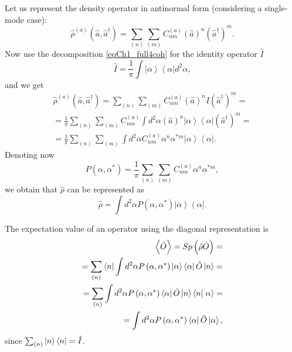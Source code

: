 Let us represent the density operator in
antinormal form (considering a single-mode case): 
\begin{equation}
\hat{\rho}^{\left(a\right)}\left(\hat{a},\hat{a}^{\dag}\right) = 
\sum_{(n)}\sum_{(m)}C^{\left(a\right)}_{nm}\left(\hat{a}\right)^n\left(\hat{a}^{\dag}\right)^m.
\end{equation}
Now use the decomposition \eqref{eqCh1_full4coh} for the identity operator $\hat{I}$
\[
\hat{I} = \frac{1}{\pi}\int \left|\alpha\right>\left<\alpha\right| d^2 \alpha,
\]
and we get
\begin{eqnarray}
\hat{\rho}^{\left(a\right)}\left(\hat{a},\hat{a}^{\dag}\right) = 
\sum_{(n)}\sum_{(m)}C^{\left(a\right)}_{nm}\left(\hat{a}\right)^n\hat{I}\left(\hat{a}^{\dag}\right)^m
= 
\nonumber \\
= \frac{1}{\pi}\sum_{(n)}\sum_{(m)}C^{\left(a\right)}_{nm}\int d^2 \alpha
\left(\hat{a}\right)^n
\left|\alpha\right>\left<\alpha\right|
\left(\hat{a}^{\dag}\right)^m = 
\nonumber \\
= \frac{1}{\pi}\sum_{(n)}\sum_{(m)}\int d^2 \alpha
C^{\left(a\right)}_{nm}
\alpha^n
\alpha^{*m}
\left|\alpha\right>\left<\alpha\right|.
\end{eqnarray}
Denoting now 
\[
P\left(\alpha, \alpha^{*}\right) = \frac{1}{\pi}\sum_{(n)}\sum_{(m)}
C^{\left(a\right)}_{nm}
\alpha^n
\alpha^{*m},
\]
we obtain that $\hat{\rho}$ can be represented as
\begin{equation}
\hat{\rho} = \int d^2 \alpha P\left(\alpha, \alpha^{*}\right) 
\left|\alpha\right>\left<\alpha\right|.
\label{eqCh1_Rho_in_alpha}
\end{equation}

The expectation value of an operator using
the diagonal representation is 
\begin{eqnarray}
\left<\hat{O}\right> = Sp \left(\hat{\rho}\hat{O}\right) =
\nonumber \\
= \sum_{(n)}\bra{n}
\int d^2 \alpha P\left(\alpha, \alpha^{*}\right) 
\left|\alpha\right>\left<\alpha\right|
\hat{O}\ket{n} =
\nonumber \\
= \sum_{(n)} \int d^2 \alpha P\left(\alpha, \alpha^{*}\right)
\left<\alpha\right|\hat{O}\ket{n}
\bra{n}\left.\alpha\right> = 
\nonumber \\
=  
\int d^2 \alpha P\left(\alpha, \alpha^{*}\right)
\left<\alpha\right|\hat{O}\left|\alpha\right>,
\label{eqCh1_middleO}
\end{eqnarray}
since $\sum_{(n)}\ket{n}\bra{n} = \hat{I}$. 

